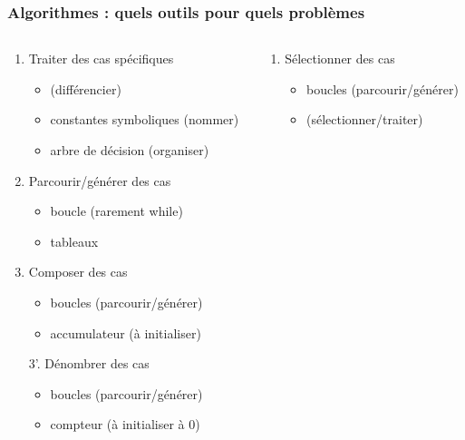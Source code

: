 \documentclass[xcolor=pdftex,svgnames,table]{beamer}
\begin{document}
\begin{frame}
  \frametitle{Algorithmes : quels outils pour quels problèmes}
\pause
\begin{columns}
 \begin{column}[t]{0.59\linewidth}
  \begin{enumerate}
    \item  Traiter des cas spécifiques 
      \begin{itemize}
      \item \alert{} (différencier)
      \item \alert{} constantes symboliques (nommer)
      \item arbre de décision (organiser)
     \end{itemize}\pause
    \item Parcourir/générer des cas\pause
      \begin{itemize}
      \item \alert{boucle } (rarement while)
      \item tableaux
      \end{itemize}\pause
   \item Composer des cas
      \begin{itemize}
        \item boucles (parcourir/générer)
        \pause
      \item \alert{accumulateur} (à initialiser)
      \end{itemize}\pause
    \item[3'.] Dénombrer des cas
      \begin{itemize}
        \item boucles (parcourir/générer)
          \pause
        \item \alert{compteur} (à initialiser à 0)
      \end{itemize}
\setcounter{savedenumi}{\value{enumi}}
\end{enumerate}
\end{column}\hspace{-1cm}
\pause
\begin{column}[t]{0.59\linewidth}
\begin{enumerate}
\setcounter{enumi}{\value{savedenumi}}
   \item Sélectionner des cas
      \begin{itemize}
        \item boucles (parcourir/générer)
        \item \alert{}  (sélectionner/traiter)

\end{itemize}
\end{enumerate}
\end{column}
\end{columns}
\end{frame}
\end{document}
